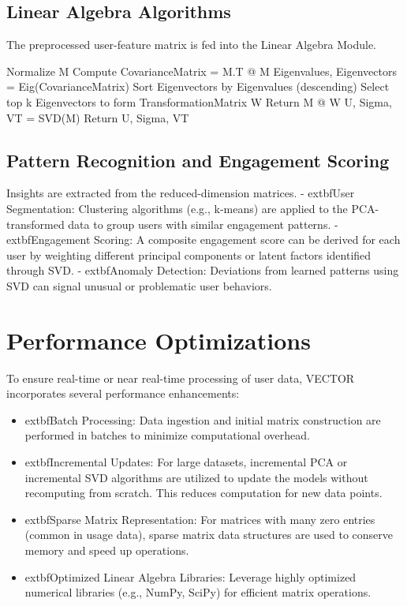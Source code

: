 \documentclass[10pt]{article}
\begin{document}
\subsection{Linear Algebra Algorithms}
The preprocessed user-feature matrix is fed into the Linear Algebra Module.
\begin{algorithmic}[1]
    \State Normalize M
    \State Compute CovarianceMatrix = M.T @ M
    \State Eigenvalues, Eigenvectors = Eig(CovarianceMatrix)
    \State Sort Eigenvectors by Eigenvalues (descending)
    \State Select top k Eigenvectors to form TransformationMatrix W
    \State Return M @ W
\EndFunction
\Statex
{}
    \State U, Sigma, VT = SVD(M)
    \State Return U, Sigma, VT
\EndFunction
\end{algorithmic}

\subsection{Pattern Recognition and Engagement Scoring}
Insights are extracted from the reduced-dimension matrices.
-   	extbf{User Segmentation}: Clustering algorithms (e.g., k-means) are applied to the PCA-transformed data to group users with similar engagement patterns.
-   	extbf{Engagement Scoring}: A composite engagement score can be derived for each user by weighting different principal components or latent factors identified through SVD.
-   	extbf{Anomaly Detection}: Deviations from learned patterns using SVD can signal unusual or problematic user behaviors.

\section{Performance Optimizations}
To ensure real-time or near real-time processing of user data, VECTOR incorporates several performance enhancements:
\begin{itemize}
    \item 	extbf{Batch Processing}: Data ingestion and initial matrix construction are performed in batches to minimize computational overhead.
    \item 	extbf{Incremental Updates}: For large datasets, incremental PCA or incremental SVD algorithms are utilized to update the models without recomputing from scratch. This reduces computation for new data points.
    \item 	extbf{Sparse Matrix Representation}: For matrices with many zero entries (common in usage data), sparse matrix data structures are used to conserve memory and speed up operations.
    \item 	extbf{Optimized Linear Algebra Libraries}: Leverage highly optimized numerical libraries (e.g., NumPy, SciPy) for efficient matrix operations.
\end{itemize}
\end{document}
